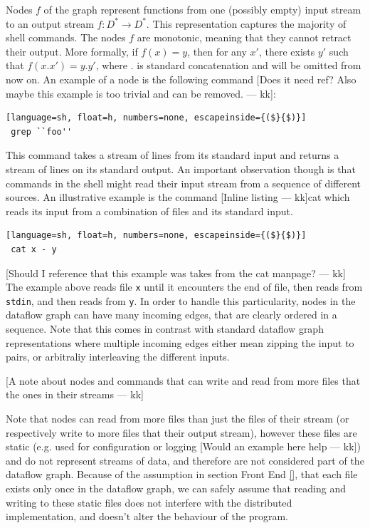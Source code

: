 \documentclass[sigplan,10pt,review,anonymous]{acmart}
\newcommand{\kk}[1]{[{\color{magenta}#1 --- kk}]}
\begin{document}
Nodes $f$ of the graph represent functions from one (possibly empty)
input stream to an output stream $f : D^* \rightarrow D^*$.  This
representation captures the majority of shell commands. The nodes $f$
are monotonic, meaning that they cannot retract their output. More
formally, if $f(x) = y$, then for any $x'$, there exists $y'$ such
that $f(x.x') = y.y'$, where $.$ is standard concatenation and will be
omitted from now on. An example of a node is the following command
\kk{Does it need ref? Also maybe this example is too trivial and can
  be removed.}:

\begin{lstlisting}[language=sh, float=h, numbers=none, escapeinside={($}{$)}]
 grep ``foo''
\end{lstlisting}

\noindent
This command takes a stream of lines from its standard input and
returns a stream of lines on its standard output. An important
observation though is that commands in the shell might read their
input stream from a sequence of different sources. An illustrative
example is the command \kk{Inline listing}cat which reads its input
from a combination of files and its standard input.

\begin{lstlisting}[language=sh, float=h, numbers=none, escapeinside={($}{$)}]
 cat x - y
\end{lstlisting}

\kk{Should I reference that this example was takes from the cat
  manpage?} The example above reads file \texttt{x} until it
encounters the end of file, then reads from \texttt{stdin}, and then
reads from \texttt{y}. In order to handle this particularity, nodes in
the dataflow graph can have many incoming edges, that are clearly
ordered in a sequence. Note that this comes in contrast with standard
dataflow graph representations where multiple incoming edges either
mean zipping the input to pairs, or arbitraliy interleaving the
different inputs.


\kk{A note about nodes and commands that can write and read from more
  files that the ones in their streams}

Note that nodes can read from more files than just the files of their
stream (or respectively write to more files that their output stream),
however these files are static (e.g. used for configuration or logging
\kk{Would an example here help}) and do not represent streams of data,
and therefore are not considered part of the dataflow graph. Because
of the assumption in section Front End \ref{}, that each file exists
only once in the dataflow graph, we can safely assume that reading and
writing to these static files does not interfere with the distributed
implementation, and doesn't alter the behaviour of the program.
\end{document}
